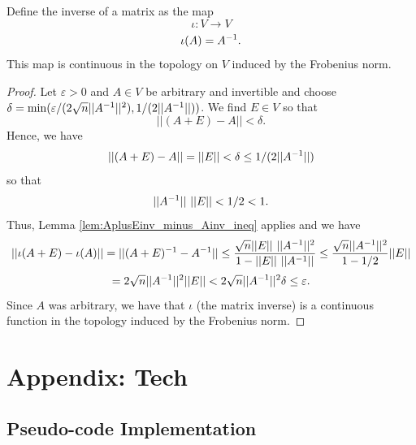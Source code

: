 \documentclass[letterpaper,titlepage]{article}
\begin{document}
\begin{thm}
    Define the inverse of a matrix as the map
    $$\iota:V \to V$$
    $$\iota(A) = A^{-1}.$$
    This map is continuous in the topology on $V$ induced by the Frobenius norm.
\end{thm}
\begin{proof}
    Let $\varepsilon>0$ and $A \in V$ be arbitrary and invertible and choose $\delta=\min(\varepsilon/(2\sqrt{n}||A^{-1}||^2), 1/(2||A^{-1}||))$. We find $E\in V$ so that 
    $$||(A+E)-A|| < \delta.$$
    Hence, we have
    $$||(A+E)-A|| = ||E|| < \delta \leq 1/(2||A^{-1}||)$$
    so that
    $$||A^{-1}||\ ||E|| < 1/2 <1.$$
    Thus, Lemma \ref{lem:AplusEinv_minus_Ainv_ineq} applies and we have
    $$||\iota(A+E)-\iota(A)||=||(A+E)\inv-A\inv||\leq\frac{\sqrt{n}||E||\ ||A\inv||^2}{1-||E||\ ||A\inv||}\leq
    \frac{\sqrt{n}||A\inv||^2}{1-1/2}||E||$$
    $$=2\sqrt{n}||A^{-1}||^2||E||< 2\sqrt{n}||A^{-1}||^2\delta \leq \varepsilon.$$
    Since $A$ was arbitrary, we have that $\iota$ (the matrix inverse) is a continuous function in the topology induced by the Frobenius norm.
\end{proof}

\section{Appendix: Tech}

\subsection{Pseudo-code Implementation}

\end{document}
